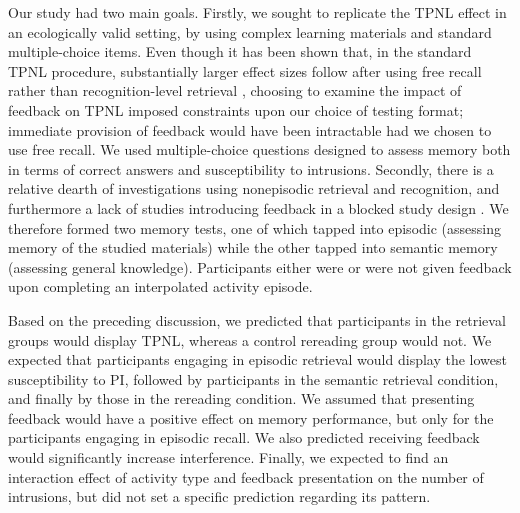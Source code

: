 \documentclass[../main.tex]{subfiles}
\begin{document}
Our study had two main goals. Firstly, we sought to replicate the TPNL 
effect in an ecologically valid setting, by using complex learning materials 
and standard multiple-choice items. Even though it has been shown that, in 
the standard TPNL procedure, substantially larger effect sizes follow after 
using free recall rather than recognition-level retrieval 
 \citep{chanRetrievalPotentiatesNew2018}, choosing to examine the impact of 
 feedback on TPNL imposed constraints upon our choice of testing format; 
 immediate provision of feedback would have been intractable had we chosen 
 to use free recall. We used multiple-choice questions designed to assess 
 memory both in terms of correct answers and susceptibility to intrusions. 
 Secondly, there is a relative dearth of investigations using nonepisodic 
 retrieval and recognition, and furthermore a lack of studies introducing 
 feedback in a blocked study design 
\citep{chanRetrievalPotentiatesNew2018}. We therefore formed two memory 
tests, one of which tapped into episodic (assessing memory of the studied 
materials) while the other tapped into semantic memory (assessing general 
knowledge). Participants either were or were not given feedback upon 
completing an interpolated activity episode.

Based on the preceding discussion, we predicted that participants in the 
retrieval groups would display TPNL, whereas a control rereading group would 
not. We expected that participants engaging in episodic retrieval would 
display the lowest susceptibility to PI, followed by participants in the 
semantic retrieval condition, and finally by those in the rereading 
condition. We assumed that presenting feedback would have a positive effect 
on memory performance, but only for the participants engaging in episodic 
recall. We also predicted receiving feedback would significantly increase 
interference. Finally, we expected to find an interaction effect of activity 
type and feedback presentation on the number of intrusions, but did not set 
a specific prediction regarding its pattern.
 
{
	\biblio
}
\end{document}
